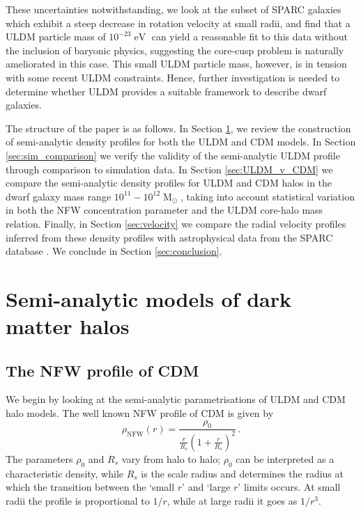 \documentclass[a4paper,11pt]{article}
\begin{document}
These uncertainties notwithstanding, we look at the subset of SPARC galaxies which exhibit a steep decrease in rotation velocity at small radii, and find that a ULDM particle mass of $10^{-23}\operatorname{eV}$ can yield a reasonable fit to this data without the inclusion of baryonic physics, suggesting the core-cusp problem is naturally ameliorated in this case. This  small ULDM particle mass, however, is in tension with some recent ULDM constraints. Hence, further investigation is needed to determine whether ULDM provides a suitable framework to describe dwarf galaxies.  

The structure of the paper is as follows. In Section \ref{sec:models}, we review the construction of semi-analytic density profiles for both the ULDM and CDM models. In Section \ref{sec:sim_comparison} we  verify the validity of the semi-analytic ULDM profile  through comparison to simulation data. In Section \ref{sec:ULDM_v_CDM} we compare the semi-analytic density profiles for ULDM and CDM halos in the dwarf galaxy mass range $10^{11} - 10^{12}\operatorname{M}_{\odot}$, taking into account statistical variation in both the NFW concentration parameter and the ULDM core-halo mass relation. Finally, in Section \ref{sec:velocity} we compare the radial velocity profiles inferred from these density profiles with astrophysical data from the SPARC database \cite{Lelli:2016zqa}. We conclude in Section \ref{sec:conclusion}.

\clearpage





\section{Semi-analytic models of dark matter halos}\label{sec:models}


\subsection{The NFW profile of CDM}

We begin by looking at the semi-analytic parametrisations of ULDM and CDM halo models. The  well known  NFW   profile of CDM \cite{Navarro:1995iw, Maccio:2008pcd}  is given by
%
\begin{equation}\label{eq:nfw}
    \rho_\mathrm{NFW}(r)=\frac{\rho_0}{\frac{r}{R_s}\left(1+\frac{r}{R_s}\right)^2} \, .
\end{equation}
%
The parameters $\rho_0$ and $R_s$ vary from halo to halo; $\rho_0$ can be interpreted as a characteristic density, while $R_s$ is the scale radius and determines the radius at which the transition between the `small $r$' and `large $r$' limits occurs. At small radii the profile is proportional to $1/r$, while at large radii it goes as $1/r^3$.
\end{document}
